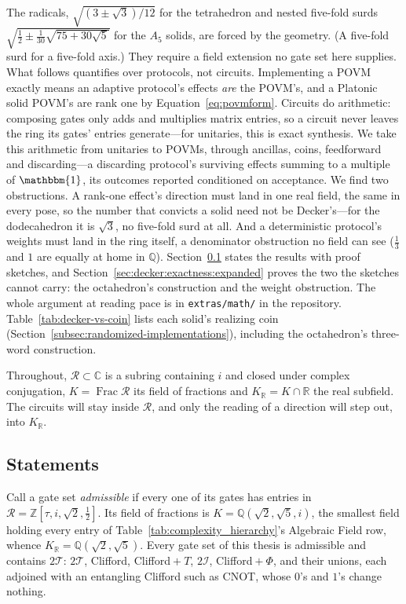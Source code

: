 \documentclass[11pt, oneside, openany]{scrbook}
\newcommand{\C}{\mathbb{C}}
\newcommand{\R}{\mathbb{R}}
\newcommand{\Id}{\mathbbm{1}}
\newcommand{\Tgroup}{\mathcal{T}}  %
\newcommand{\Igroup}{\mathcal{I}}  %
\newcommand{\TwoT}{2\Tgroup}
\newcommand{\TwoI}{2\Igroup}
\newcommand{\phig}{\tau} %
\begin{document}
The radicals, $\sqrt{(3\pm\sqrt{3})/12}$ for the tetrahedron and nested five-fold surds $\sqrt{\tfrac{1}{2} \pm \tfrac{1}{30}\sqrt{75 + 30\sqrt{5}}}$ for the $A_5$ solids, are forced by the geometry. (A five-fold surd for a five-fold axis.) They require a field extension no gate set here supplies. What follows quantifies over protocols, not circuits. Implementing a POVM exactly means an adaptive protocol's effects \textit{are} the POVM's, and a Platonic solid POVM's are rank one by Equation~\eqref{eq:povmform}. Circuits do arithmetic: composing gates only adds and multiplies matrix entries, so a circuit never leaves the ring its gates' entries generate---for unitaries, this is exact synthesis. We take this arithmetic from unitaries to POVMs, through ancillas, coins, feedforward and discarding---a discarding protocol's surviving effects summing to a multiple of $\Id$, its outcomes reported conditioned on acceptance. We find two obstructions. A rank-one effect's direction must land in one real field, the same in every pose, so the number that convicts a solid need not be Decker's---for the dodecahedron it is $\sqrt{3}$, no five-fold surd at all. And a deterministic protocol's weights must land in the ring itself, a denominator obstruction no field can see ($\tfrac{1}{3}$ and $1$ are equally at home in $\mathbb{Q}$). Section~\ref{sec:decker:statements} states the results with proof sketches, and Section~\ref{sec:decker:exactness:expanded} proves the two the sketches cannot carry: the octahedron's construction and the weight obstruction. The whole argument at reading pace is in \texttt{extras/math/} in the repository. Table~\ref{tab:decker-vs-coin} lists each solid's realizing coin (Section~\ref{subsec:randomized-implementations}), including the octahedron's three-word construction.

Throughout, $\mathcal{R} \subset \C$ is a subring containing $i$ and closed under complex conjugation, $K = \operatorname{Frac}\mathcal{R}$ its field of fractions and $K_\R = K \cap \R$ the real subfield. The circuits will stay inside $\mathcal{R}$, and only the reading of a direction will step out, into $K_\R$.



\subsection{Statements} \label{sec:decker:statements}

Call a gate set \textit{admissible} if every one of its gates has entries in $\mathcal{R} = \mathbb{Z}[\phig, i, \sqrt{2}, \tfrac{1}{2}]$. Its field of fractions is $K = \mathbb{Q}(\sqrt{2},\sqrt{5},i)$, the smallest field holding every entry of Table~\ref{tab:complexity_hierarchy}'s Algebraic Field row, whence $K_\R = \mathbb{Q}(\sqrt{2},\sqrt{5})$. Every gate set of this thesis is admissible and contains $\TwoT$: $\TwoT$, Clifford, Clifford${}+T$, $\TwoI$, Clifford${}+\Phi$, and their unions, each adjoined with an entangling Clifford such as CNOT, whose $0$'s and $1$'s change nothing.
\end{document}
